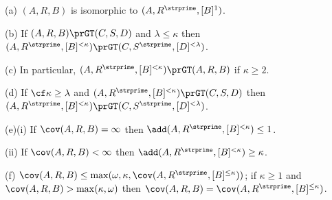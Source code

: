 (a) $(A,R,B)$ is isomorphic to $(A,R^{\strprime},[B]^1)$.

(b) If $(A,R,B)\prGT(C,S,D)$ and $\lambda\le\kappa$ then
$(A,R^{\strprime},[B]^{<\kappa})\prGT(C,S^{\strprime},[D]^{<\lambda})$.

(c) In particular, $(A,R^{\strprime},[B]^{<\kappa})\prGT(A,R,B)$ if
$\kappa\ge 2$.

(d) If $\cf\kappa\ge\lambda$ and
$(A,R^{\strprime},[B]^{<\kappa})\prGT(C,S,D)$ then
$(A,R^{\strprime},[B]^{<\kappa})\prGT(C,S^{\strprime},[D]^{<\lambda})$.

(e)(i) If $\cov(A,R,B)=\infty$ then
$\add(A,R^{\strprime},[B]^{<\kappa})\le 1$.

\quad(ii) If $\cov(A,R,B)<\infty$ then
$\add(A,R^{\strprime},[B]^{<\kappa})\ge\kappa$.

(f) $\cov(A,R,B)
\le\max(\omega,\kappa,\cov(A,R^{\strprime},[B]^{\le\kappa}))$;  if
$\kappa\ge 1$ and $\cov(A,R,B)>\max(\kappa,\omega)$ then
$\cov(A,R,B)\penalty-100=\cov(A,R^{\strprime},[B]^{\le\kappa})$.

